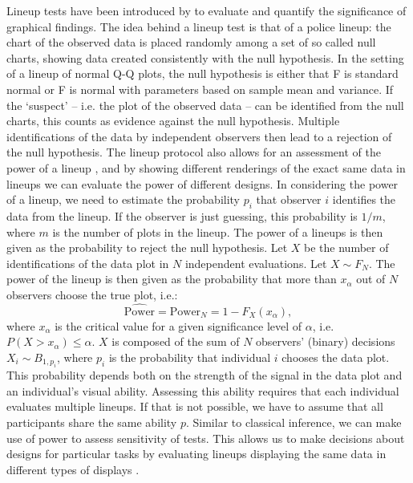 \documentclass{article}\usepackage[]{graphicx}\usepackage[]{color}
\begin{document}
Lineup tests have been introduced by \citet{buja:2009hp} to evaluate and quantify the significance of graphical findings. The idea behind a lineup test is that of a police lineup: the chart of the observed data is placed randomly among a set of so called null charts, showing data created consistently with the null hypothesis. In the setting of a lineup of normal Q-Q plots, the null hypothesis  is either that F is standard normal or F is normal with parameters based on sample mean and variance.
If the `suspect' -- i.e. the plot of the observed data -- can be identified from the null charts, this counts as evidence against the null hypothesis. Multiple identifications of the data by independent observers then lead to a rejection of the null hypothesis. 
The lineup protocol also allows for an assessment of the power of a lineup \citep{mahbub:2013},  
and by showing different renderings of the exact same data in lineups we can evaluate the power  of different designs.
In considering the power of a lineup, we need to estimate the probability $p_i$ that observer $i$ identifies the data from the lineup. If the observer is just guessing, this probability is $1/m$, where $m$ is the number of plots in the lineup.
The power of a lineups is then given as the probability to reject the null hypothesis. Let $X$ be the number of identifications of the data plot in $N$ independent evaluations. Let $X \sim F_N$. The power of the lineup is then given as the probability that more than $x_\alpha$ out of $N$ observers
choose the true plot, i.e.:
\begin{equation}\label{eqn:power}
\widehat{\text{Power}} = \text{Power}_{N} = 1 - F_{X} (x_{\alpha}),
\end{equation}
where $x_\alpha$ is the critical value for a given significance level of $\alpha$, i.e.~$P(X >  x_{\alpha}) \le \alpha$. $X$ is composed of the sum of $N$ observers' (binary) decisions $X_i \sim B_{1, p_i}$, where  $p_i$ is the probability that individual $i$ chooses the data plot. This probability  depends both on the strength of the signal in the data plot and an individual's visual ability.
Assessing this ability requires that each individual evaluates multiple lineups. 
If that is not possible, we have to assume that all participants share the same ability $p$.%
Similar to classical inference, we can make use of power to assess sensitivity of tests. This allows us to make decisions about designs for particular tasks by evaluating lineups displaying  the same data in different types of displays \citep{Hofmann:2012ts}. 
\end{document}
